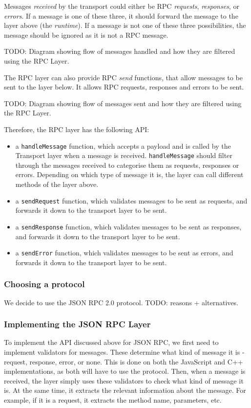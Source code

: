 Messages \emph{received} by the transport could either be RPC \emph{requests}, \emph{responses}, or \emph{errors}. If a message is one of these three, it should forward the message to the layer above (the \emph{runtime}). If a message is not one of these three possibilities, the message should be ignored as it is not a RPC message.

TODO: Diagram showing flow of messages handled and how they are filtered using the RPC Layer.

The RPC layer can also provide RPC \emph{send} functions, that allow messages to be sent to the layer below. It allows RPC requests, responses and errors to be sent.

TODO: Diagram showing flow of messages sent and how they are filtered using the RPC Layer.

Therefore, the RPC layer has the following API:
\begin{itemize}
	\item a \lstinline+handleMessage+ function, which accepts a payload and is called by the Transport layer when a message is received. \lstinline+handleMessage+ should filter through the messages received to categorise them as requests, responses or errors. Depending on which type of message it is, the layer can call different methods of the layer above.
	\item a \lstinline+sendRequest+ function, which validates messages to be sent as requests, and forwards it down to the transport layer to be sent.
	\item a \lstinline+sendResponse+ function, which validates messages to be sent as responses, and forwards it down to the transport layer to be sent.
	\item a \lstinline+sendError+ function, which validates messages to be sent as errors, and forwards it down to the transport layer to be sent.
\end{itemize}

\subsubsection{Choosing a protocol} %
\label{ssub:choosing_a_protocol}
We decide to use the JSON RPC 2.0 protocol. TODO: reasons + alternatives.

\subsubsection{Implementing the JSON RPC Layer} %
\label{ssub:implementing_the_jsonrpc_layer}
To implement the API discussed above for JSON RPC, we first need to implement validators for messages. These determine what kind of message it is - request, response, error, or none. This is done on both the JavaScript and C++ implementations, as both will have to use the protocol. Then, when a message is received, the layer simply uses these validators to check what kind of message it is. At the same time, it extracts the relevant information about the message. For example, if it is a request, it extracts the method name, parameters, etc. 

